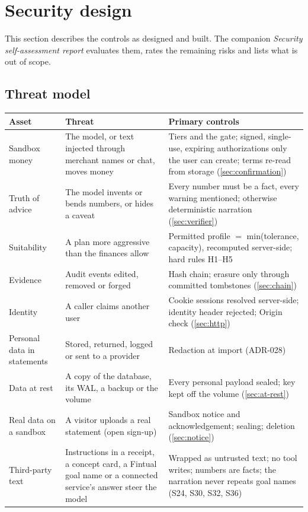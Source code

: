 \section{Security design}\label{sec:security}

This section describes the controls as designed and built. The companion \emph{Security self-assessment report}
evaluates them, rates the remaining risks and lists what is out of scope.

\subsection{Threat model}

\begin{table}[htbp]
  \centering
  \small
  \begin{tabularx}{\linewidth}{@{}p{26mm}XX@{}}
    \toprule
    Asset & Threat & Primary controls \\
    \midrule
    Sandbox money & The model, or text injected through merchant names or chat, moves money & Tiers and the gate; signed, single-use, expiring authorizations only the user can create; terms re-read from storage (\cref{sec:confirmation}) \\
    Truth of advice & The model invents or bends numbers, or hides a caveat & Every number must be a fact, every warning mentioned; otherwise deterministic narration (\cref{sec:verifier}) \\
    Suitability & A plan more aggressive than the finances allow & Permitted profile $=$ min(tolerance, capacity), recomputed server-side; hard rules H1--H5 \\
    Evidence & Audit events edited, removed or forged & Hash chain; erasure only through committed tombstones (\cref{sec:chain}) \\
    Identity & A caller claims another user & Cookie sessions resolved server-side; identity header rejected; Origin check (\cref{sec:http}) \\
    Personal data in statements & Stored, returned, logged or sent to a provider & Redaction at import (ADR-028) \\
    Data at rest & A copy of the database, its WAL, a backup or the volume & Every personal payload sealed; key kept off the volume (\cref{sec:at-rest}) \\
    Real data on a sandbox & A visitor uploads a real statement (open sign-up) & Sandbox notice and acknowledgement; sealing; deletion (\cref{sec:notice}) \\
    Third-party text & Instructions in a receipt, a concept card, a Fintual goal name or a connected service's answer steer the model & Wrapped as untrusted text; no tool writes; numbers are facts; the narration never repeats goal names (S24, S30, S32, S36) \\

\end{tabularx}
\end{table}
